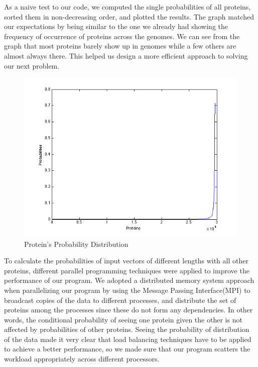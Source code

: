 \documentclass{ucetd}
\begin{document}
\newpage
As a naive test to our code, we computed the single probabilities of all proteins, sorted them in non-decreasing order, and plotted the results. The graph matched our expectations by being similar to the one we already had showing the frequency of occurrence of proteins across the genomes. 
We can see from the graph that most proteins barely show up in genomes while a few others are almost always there. This helped us design a more efficient approach to solving our next problem. 
\begin{figure}[b!]
\centering
\includegraphics[scale=0.8]{sorted}
\caption{Protein's Probability Distribution}
\label{fig:Protein's Probability Distribution}
\end{figure}
\newpage

To calculate the probabilities of input vectors of different lengths with all other proteins, different parallel programming techniques were applied to improve the performance of our program.
We adopted a distributed memory system approach when parallelizing our program by using the Message Passing Interface(MPI) to broadcast copies of the data to different processes, and distribute the set of proteins among the processes since these do not form any dependencies. In other words, the conditional probability of seeing one protein given the other is not affected by probabilities of other proteins.
Seeing the probability of distribution of the data made it very clear that load balancing techniques have to be applied to achieve a better performance, so we made sure that our program scatters the workload appropriately across different processors. 
\end{document}
